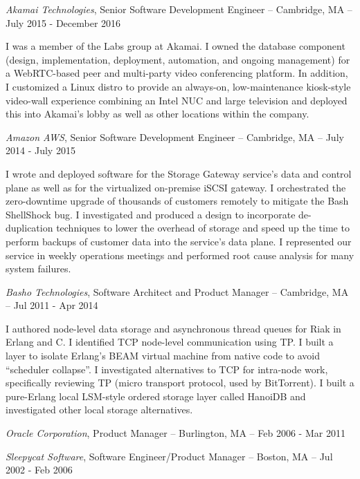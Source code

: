 \documentclass[letterpaper]{article}
\renewenvironment{itemize}{
  \begin{list}{}{
    \setlength{\leftmargin}{1.5em}
  }
}{
  \end{list}
}
\begin{document}
\begin{itemize}
\item {\it Akamai Technologies}, Senior Software Development Engineer -- Cambridge, MA -- July 2015 - December 2016

I was a member of the Labs group at Akamai. I owned the database component (design, implementation, deployment, automation, and ongoing management) for a WebRTC-based peer and multi-party video conferencing platform. In addition, I customized a Linux distro to provide an always-on, low-maintenance kiosk-style video-wall experience combining an Intel NUC and large television and deployed this into Akamai's lobby as well as other locations within the company.

\item {\it Amazon AWS}, Senior Software Development Engineer -- Cambridge, MA -- July 2014 - July 2015

I wrote and deployed software for the Storage Gateway service’s data and control plane as well as for the virtualized on-premise iSCSI gateway. I orchestrated the zero-downtime upgrade of thousands of customers remotely to mitigate the Bash ShellShock bug. I investigated and produced a design to incorporate de-duplication techniques to lower the overhead of storage and speed up the time to perform backups of customer data into the service’s data plane. I represented our service in weekly operations meetings and performed root cause analysis for many system failures.

\item {\it Basho Technologies}, Software Architect and Product Manager -- Cambridge, MA -- Jul 2011 - Apr 2014

I authored node-level data storage and asynchronous thread queues for Riak in Erlang and C. I identified TCP node-level communication using \si{\micro}TP. I built a layer to isolate Erlang’s BEAM virtual machine from native code to avoid “scheduler collapse”. I investigated alternatives to TCP for intra-node work, specifically reviewing  \si{\micro}TP (micro transport protocol, used by BitTorrent). I built a pure-Erlang local LSM-style ordered storage layer called HanoiDB and investigated other local storage alternatives.

\item {\it Oracle Corporation}, Product Manager -- Burlington, MA -- Feb 2006 - Mar 2011

\item {\it Sleepycat Software}, Software Engineer/Product Manager -- Boston, MA -- Jul 2002 - Feb 2006


\end{itemize}
\end{document}
